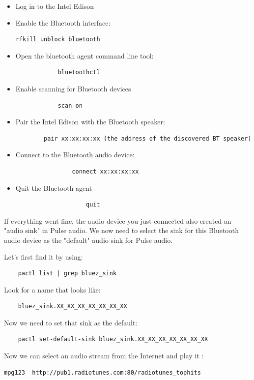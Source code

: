 \documentclass[12pt,a4paper]{scrreprt}
\begin{document}
\begin{itemize}
	\item Log in to the Intel Edison
	\item Enable the Bluetooth interface: 
	\begin{verbatim}
rfkill unblock bluetooth
	\end{verbatim}
		\item Open the bluetooth agent command line tool:
			\begin{verbatim}
			bluetoothctl
			\end{verbatim}
			\item Enable scanning for Bluetooth devices
			\begin{verbatim}
			scan on
			\end{verbatim}
			\item Pair the Intel Edison with the Bluetooth speaker:
			\begin{verbatim}
		pair xx:xx:xx:xx (the address of the discovered BT speaker)
			\end{verbatim}
				\item Connect to the Bluetooth audio device:
				\begin{verbatim}
				connect xx:xx:xx:xx 
				\end{verbatim}
					\item Quit the Bluetooth agent
					\begin{verbatim}
					quit
					\end{verbatim}	
\end{itemize}

If everything went fine, the audio device you just connected also created an "audio sink" in Pulse audio. We now need to select the sink for this Bluetooth audio device as the "default" audio sink for Pulse audio.

Let's first find it by using:
	\begin{verbatim}
	pactl list | grep bluez_sink
	\end{verbatim}
Look for a name that looks like:
	\begin{verbatim}
	bluez_sink.XX_XX_XX_XX_XX_XX_XX
	\end{verbatim}


Now we need to set that sink as the default:
	\begin{verbatim}
	pactl set-default-sink bluez_sink.XX_XX_XX_XX_XX_XX_XX 
	\end{verbatim}

Now we can select an audio stream from the Internet and play it :
	\begin{verbatim}
mpg123  http://pub1.radiotunes.com:80/radiotunes_tophits
	\end{verbatim}
\end{document}
